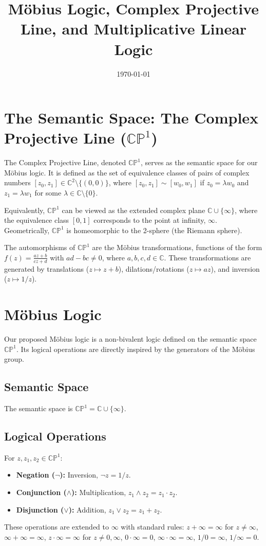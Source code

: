 \documentclass{article}
\title{Möbius Logic, Complex Projective Line, and Multiplicative Linear Logic}
\author{}
\date{\today}
\begin{document}
	\maketitle

	\section{The Semantic Space: The Complex Projective Line ($\mathbb{CP}^1$)}

	The Complex Projective Line, denoted $\mathbb{CP}^1$, serves as the semantic space for our Möbius logic. It is defined as the set of equivalence classes of pairs of complex numbers $[z_0, z_1] \in \mathbb{C}^2 \setminus \{(0,0)\}$, where $[z_0, z_1] \sim [w_0, w_1]$ if $z_0 = \lambda w_0$ and $z_1 = \lambda w_1$ for some $\lambda \in \mathbb{C} \setminus \{0\}$.

	Equivalently, $\mathbb{CP}^1$ can be viewed as the extended complex plane $\mathbb{C} \cup \{\infty\}$, where the equivalence class $[0, 1]$ corresponds to the point at infinity, $\infty$. Geometrically, $\mathbb{CP}^1$ is homeomorphic to the 2-sphere (the Riemann sphere).

	The automorphisms of $\mathbb{CP}^1$ are the M\"{o}bius transformations, functions of the form $f(z) = \frac{az+b}{cz+d}$ with $ad-bc \neq 0$, where $a, b, c, d \in \mathbb{C}$. These transformations are generated by translations ($z \mapsto z+b$), dilations/rotations ($z \mapsto az$), and inversion ($z \mapsto 1/z$).

	\section{Möbius Logic}

	Our proposed M\"{o}bius logic is a non-bivalent logic defined on the semantic space $\mathbb{CP}^1$. Its logical operations are directly inspired by the generators of the M\"{o}bius group.

	\subsection{Semantic Space}
	The semantic space is $\mathbb{CP}^1 = \mathbb{C} \cup \{\infty\}$.

	\subsection{Logical Operations}
	For $z, z_1, z_2 \in \mathbb{CP}^1$:
	\begin{itemize}
		\item \textbf{Negation ($\neg$):} Inversion, $\neg z = 1/z$.
		\item \textbf{Conjunction ($\wedge$):} Multiplication, $z_1 \wedge z_2 = z_1 \cdot z_2$.
		\item \textbf{Disjunction ($\vee$):} Addition, $z_1 \vee z_2 = z_1 + z_2$.
	\end{itemize}
	These operations are extended to $\infty$ with standard rules: $z+\infty = \infty$ for $z \neq \infty$, $\infty+\infty=\infty$, $z \cdot \infty = \infty$ for $z \neq 0, \infty$, $0 \cdot \infty = 0$, $\infty \cdot \infty = \infty$, $1/0 = \infty$, $1/\infty = 0$.
\end{document}
